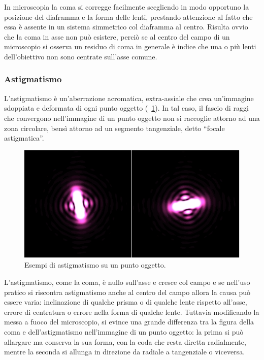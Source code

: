 In microscopia la coma si corregge facilmente scegliendo in modo opportuno la posizione del diaframma e la forma delle lenti, prestando attenzione al fatto che essa è assente in un sistema simmetrico col diaframma al centro.
Risulta ovvio che la coma in asse non può esistere, perciò se al centro del campo di un microscopio si osserva un residuo di coma in generale è indice che una o più lenti dell'obiettivo non sono centrate sull'asse comune.

\subsubsection*{Astigmatismo}
L'astigmatismo è un'aberrazione acromatica, extra-assiale che crea un'immagine sdoppiata e deformata di ogni punto oggetto (\figurename~\ref{fig:astigmatismo}). In tal caso, il fascio di raggi che convergono nell'immagine di un punto oggetto non si raccoglie attorno ad una zona circolare, bensì attorno ad un segmento tangenziale, detto ``focale astigmatica''.

\begin{figure}
 \centering
 \includegraphics[scale=.50]{img/CAP2astig.jpg}
 \caption{\small{Esempi di astigmatismo su un punto oggetto.}}
 \label{fig:astigmatismo}
\end{figure}

L'astigmatismo, come la coma, è nullo sull'asse e cresce col campo e se nell'uso pratico si riscontra astigmatismo anche al centro del campo allora la causa può essere varia: inclinazione di qualche prisma o di qualche lente rispetto all'asse, errore di centratura o errore nella forma di qualche lente.
Tuttavia modificando la messa a fuoco del microscopio, si evince una grande differenza tra la figura della coma e dell'astigmatismo nell'immagine di un punto oggetto: la prima si può allargare ma conserva la sua forma, con la coda che resta diretta radialmente, mentre la seconda si allunga in direzione da radiale a tangenziale o viceversa. 

